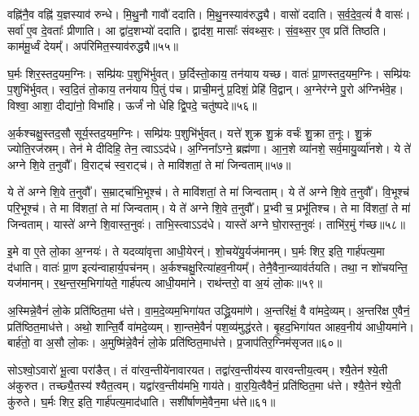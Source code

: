 वह्नि॑नै॒व वह्नि॑ य॒ज्ञस्याव॑ रुन्धे।
मि॒थु॒नौ गावौ॑ ददाति।
मि॒थु॒नस्या\-व॑\-रुद्ध्यै।
वासो॑ ददाति।
स॒र्व॒दे॒व॒त्यं॑ वै वासः॑।
सर्वा॑ ए॒व दे॒वताः᳚ प्रीणाति।
आ द्वा॑द॒शभ्यो॑ ददाति।
द्वाद॑श॒ मासाः᳚ संवथ्स॒रः।
सं॒व॒थ्स॒र ए॒व प्रति॑ तिष्ठति।
काम॑मू॒र्ध्वं देयम्᳚।
अप॑रिमित॒स्या\-व॑\-रुद्ध्यै॥५५॥\ip\anuvakamend[आ॒दि॒त्ये तृती॑यम॒फ्स्वासी॒त्तत्तेनावा॑रुन्धत॒ स्यादा᳚प्यते॒ रेतो॒\-ऽग्निरेक॑मेकमे॒तानि॑ ह॒वीꣳषि॑ नि॒र्वपे᳚त्प्र॒त्यव॑रोहति ददात्यध्व॒र्युर्देय॒मेकं॑ च]

घ॒र्मः शिर॒स्तद॒यम॒ग्निः।
सम्प्रि॑यः प॒शुभि॑र्भुवत्।
छ॒र्दिस्तो॒काय॒ तन॑याय यच्छ।
वातः॑ प्रा॒णस्तद॒यम॒ग्निः।
सम्प्रि॑यः प॒शुभि॑र्भुवत्।
स्व॒दि॒तं तो॒काय॒ तन॑याय पि॒तुं प॑च।
प्राची॒मनु॑ प्र॒दिशं॒ प्रेहि॑ वि॒द्वान्।
अ॒ग्नेर॑ग्ने पु॒रो अ॑ग्निर्भवे॒ह।
विश्वा॒ आशा॒ दीद्या॑नो॒ विभा॑हि।
ऊर्जं॑ नो धेहि द्वि॒पदे॒ चतु॑ष्पदे॥५६॥\ip

अ॒र्कश्चक्षु॒स्तद॒सौ सूर्य॒स्तद॒यम॒ग्निः।
सम्प्रि॑यः प॒शुभि॑र्भुवत्।
यत्ते॑ शुक्र शु॒क्रं वर्चः॑ शु॒क्रा त॒नूः।
शु॒क्रं ज्योति॒रज॑स्रम्।
तेन॑ मे दीदिहि॒ तेन॒ त्वाऽऽद॑धे।
अ॒ग्निना᳚\-ऽग्ने॒ ब्रह्म॑णा।
आ॒न॒शे व्या॑नशे॒ सर्व॒मायु॒र्व्या॑नशे।
ये ते॑ अग्ने शि॒वे त॒नुवौ᳚।
वि॒राट्च॑ स्व॒राट्च॑।
ते मावि॑शतां॒ ते मा॑ जिन्वताम्॥५७॥\ip

ये ते॑ अग्ने शि॒वे त॒नुवौ᳚।
स॒म्राट्चा॑भि॒भूश्च॑।
ते मावि॑शतां॒ ते मा॑ जिन्वताम्।
ये ते॑ अग्ने शि॒वे त॒नुवौ᳚।
वि॒भूश्च॑ परि॒भूश्च॑।
ते मा वि॑शतां॒ ते मा॑ जिन्वताम्।
ये ते॑ अग्ने शि॒वे त॒नुवौ᳚।
प्र॒भ्वी च॒ प्रभू॑तिश्च।
ते मा वि॑शतां॒ ते मा॑ जिन्वताम्।
यास्ते॑ अग्ने शि॒वास्त॒नुवः॑।
ताभि॒स्त्वाऽऽद॑धे।
यास्ते॑ अग्ने घो॒रास्त॒नुवः॑।
ताभि॑र॒मुं ग॑च्छ॥५८॥\ip\anuvakamend[चतु॑ष्पदे जिन्वतां त॒नुव॒स्त्रीणि॑ च]

इ॒मे वा ए॒ते लो॒का अ॒ग्नयः॑।
ते यदव्या॑वृत्ता आधी॒येरन्॑।
शो॒चये॑यु॒र्यज॑मानम्।
घ॒र्मः शिर॒ इति॒ गार्\mbox{}ह॑पत्य॒मा द॑धाति।
वातः॑ प्रा॒ण इत्य॑न्वाहार्य॒पच॑नम्।
अ॒र्कश्चक्षु॒रित्या॑हव॒नीयम्᳚।
तेनै॒वै\-ना॒न्व्या\-व॑र्तयति।
तथा॒ न शो॑चयन्ति॒ यज॑मानम्।
र॒थ॒न्त॒रम॒भिगा॑यते॒ गार्\mbox{}ह॑पत्य आधी॒यमा॑ने।
राथ॑न्तरो॒ वा अ॒यं लो॒कः॥५९॥\ip

अ॒स्मिन्ने॒वैनं॑ लो॒के प्रति॑\-ष्ठित॒मा ध॑त्ते।
वा॒म॒दे॒व्यम॒भिगा॑यत उद्ध्रि॒यमा॑णे।
अ॒न्तरि॑क्षं॒ वै वा॑मदे॒व्यम्।
अ॒न्तरि॑क्ष ए॒वैनं॒ प्रति॑\-ष्ठित॒माध॑त्ते।
अथो॒ शान्ति॒र्वै वा॑मदे॒व्यम्।
शा॒न्तमे॒वैनं॑ पश॒व्य॑मुद्ध॑रते।
बृ॒हद॒भिगा॑यत आहव॒नीय॑ आधी॒यमा॑ने।
बार्\mbox{}ह॑तो॒ वा अ॒सौ लो॒कः।
अ॒मुष्मि॑न्ने॒वैनं॑ लो॒के प्रति॑\-ष्ठित॒माध॑त्ते।
प्र॒जा\-प॑तिर॒ग्निम॑\-सृजत॥६०॥\ip

सोऽश्वो॒\-ऽवारो॑ भू॒त्वा परा॑ङैत्।
तं वा॑रव॒न्तीये॑नावारयत।
तद्वा॑रव॒न्तीय॑स्य वारवन्तीय॒त्वम्।
श्यै॒तेन॑ श्ये॒ती अ॑कुरुत।
तच्छ्यै॒तस्य॑ श्यैत॒त्वम्।
यद्वा॑रव॒न्तीय॑मभि॒ गाय॑ते।
वा॒र॒यि॒त्वैवैनं॒ प्रति॑\-ष्ठित॒मा ध॑त्ते।
श्यै॒तेन॑ श्ये॒ती कु॑रुते।
घ॒र्मः शिर॒ इति॒ गार्\mbox{}ह॑पत्य॒माद॑धाति।
सशी॑र्\mbox{}षाणमे॒वैन॒मा ध॑त्ते॥६१॥\ip

